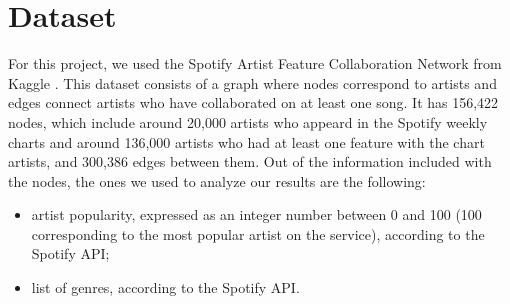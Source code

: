 \section{Dataset}

For this project, we used the Spotify Artist Feature Collaboration Network from Kaggle \cite{dataset}. This dataset consists of a graph where nodes correspond to artists and edges connect artists who have collaborated on at least one song. It has 156,422 nodes, which include around 20,000 artists who appeard in the Spotify weekly charts and around 136,000 artists who had at least one feature with the chart artists, and 300,386 edges between them. Out of the information included with the nodes, the ones we used to analyze our results are the following:
\begin{itemize}
    \item artist popularity, expressed as an integer number between 0 and 100 (100 corresponding to the most popular artist on the service), according to the Spotify API;
    \item list of genres, according to the Spotify API.
\end{itemize}